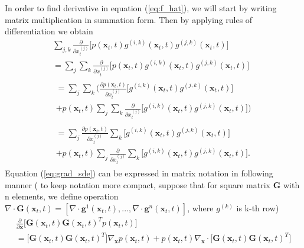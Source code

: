 \documentclass[10pt]{article}
\begin{document}
In order to find derivative in equation (\ref{eq:f_hat}), we will start by writing matrix multiplication in summation form. Then by applying rules of differentiation we obtain 
\begin{gather} 
        \sum_{j, k} \frac{\partial}{\partial x_t^{(j)}} \Big[p(\textbf{x}_t , t)
        g^{(i,k)}(\textbf{x}_t , t)  g^{(j,k)}(\textbf{x}_t , t) \Big] \\
        = \sum_{j} \sum_k  \frac{\partial}{\partial x_t^{(j)}} \Big[p(\textbf{x}_t , t)
        g^{(i,k)}(\textbf{x}_t , t)  g^{(j,k)}(\textbf{x}_t , t) \Big] \\
         \begin{gathered}
        =\sum_{j} \sum_k \Big(  \frac{\partial p(\textbf{x}_t , t)}{\partial x_t^{(j)}} \Big[
        g^{(i,k)}(\textbf{x}_t , t)  g^{(j,k)}(\textbf{x}_t , t) \Big]  \\
        +  p(\textbf{x}_t , t) \sum_{j} \sum_k \frac{\partial}{\partial x_t^{(j)}} \Big[
        g^{(i,k)}(\textbf{x}_t , t)  g^{(j,k)}(\textbf{x}_t , t) \Big] \Big)
        \end{gathered}\\
        \begin{gathered} \label{eq:grad_sde} = 
        \sum_{j}  \frac{\partial p(\textbf{x}_t , t)}{\partial x_t^{(j)}}  \sum_k \Big[
        g^{(i,k)}(\textbf{x}_t , t)  g^{(j,k)}(\textbf{x}_t , t) \Big]  \\
          + p(\textbf{x}_t , t) \sum_{j}\frac{\partial}{\partial x_t^{(j)}}  \sum_k \Big[
        g^{(i,k)}(\textbf{x}_t , t)  g^{(j,k)}(\textbf{x}_t , t) \Big].
               \end{gathered}
\end{gather}
Equation (\ref{eq:grad_sde}) can be expressed in matrix notation in following manner
( to keep notation more compact, suppose that for square matrix \textbf{G} with n elements, we define operation $\nabla \cdot \textbf{G}(\textbf{x}_t, t) = [\nabla \cdot \textbf{g}^1(\textbf{x}_t, t), ... ,\nabla \cdot \textbf{g}^n(\textbf{x}_t, t) ]$, where $g^{(k)}$ is k-th row)
\begin{gather}
    \frac{\partial}{\partial \textbf{x}} \Big[ \textbf{G}(\textbf{x}_t, t) \textbf{G}(\textbf{x}_t, t) ^T p(\textbf{x}_t , t) \Big] \\
    = \label{eq:sde_grad_G}
    \Big[ \textbf{G}(\textbf{x}_t, t) \textbf{G}(\textbf{x}_t, t) ^T \Big]
    \nabla_{\textbf{x}} p(\textbf{x}_t , t)
    +
    p(\textbf{x}_t , t) \nabla_{\textbf{x}} \cdot  \Big[ \textbf{G}(\textbf{x}_t, t) \textbf{G}(\textbf{x}_t, t) ^T \Big]
\end{gather}
\end{document}
